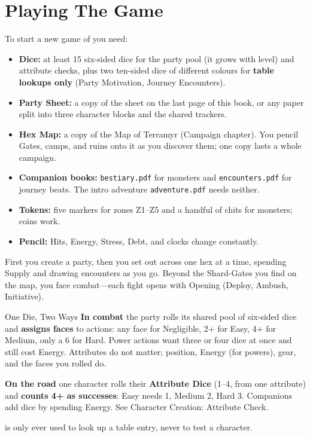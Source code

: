 \section{Playing The Game}

To start a new game of \game{} you need:

\begin{itemize}
    \item \textbf{Dice:} at least 15 six-sided dice for the party pool (it grows with level) and attribute checks, plus two ten-sided dice of different colours for \dper{} \textbf{table lookups only} (Party Motivation, Journey Encounters).
    \item \textbf{Party Sheet:} a copy of the sheet on the last page of this book, or any paper split into three character blocks and the shared trackers.
    \item \textbf{Hex Map:} a copy of the Map of Terramyr (Campaign chapter). You pencil Gates, camps, and ruins onto it as you discover them; one copy lasts a whole campaign.
    \item \textbf{Companion books:} \texttt{bestiary.pdf} for monsters and \texttt{encounters.pdf} for journey beats. The intro adventure \texttt{adventure.pdf} needs neither.
    \item \textbf{Tokens:} five markers for zones Z1--Z5 and a handful of chits for monsters; coins work.
    \item \textbf{Pencil:} Hits, Energy, Stress, Debt, and clocks change constantly.
\end{itemize}

First you create a party, then you set out across \world{} one hex at a time, spending Supply and drawing encounters as you go. Beyond the Shard-Gates you find on the map, you face combat---each fight opens with Opening (Deploy, Ambush, Initiative).

\begin{rpgbox}{{One Die, Two Ways}}
    \textbf{In combat} the party rolls its shared pool of six-sided dice and \textbf{assigns faces} to actions: any face for Negligible, 2+ for Easy, 4+ for Medium, only a 6 for Hard. Power actions want three or four dice at once and still cost Energy. Attributes do not matter; position, Energy (for powers), gear, and the faces you rolled do.

    \textbf{On the road} one character rolls their \textbf{Attribute Dice} (1--4, from one attribute) and \textbf{counts 4+ as successes}: Easy needs 1, Medium 2, Hard 3. Companions add dice by spending Energy. See Character Creation: Attribute Check.

    \dper{} is only ever used to look up a table entry, never to test a character.
\end{rpgbox}

